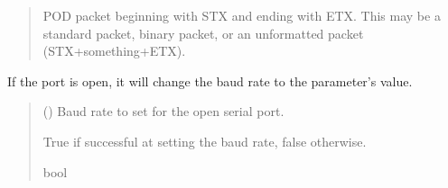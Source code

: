 \documentclass[letterpaper,10pt,english]{sphinxmanual}
\begin{document}
\begin{fulllineitems}
\begin{fulllineitems}
\begin{quote}
\begin{description}
\sphinxAtStartPar
POD packet beginning with STX and ending with ETX. This may be a                 standard packet, binary packet, or an unformatted packet (STX+something+ETX).

\sphinxAtStartPar
{\hyperref[\detokenize{Morelia.Packets:Morelia.Packets.Packet.Packet}]{}}

\end{description}\end{quote}

\end{fulllineitems}


\begin{fulllineitems}
\label{\detokenize{Morelia.Devices:Morelia.Devices.BasicPodProtocol.Pod.SetBaudrateOfDevice}}
\pysigstartsignatures
{}
\pysigstopsignatures
\sphinxAtStartPar
If the port is open, it will change the baud rate to the parameter’s value.
\begin{quote}\begin{description}
\sphinxAtStartPar
{} () \textendash{} Baud rate to set for the open serial port.

\sphinxAtStartPar
True if successful at setting the baud rate, false otherwise.

\sphinxAtStartPar
bool

\end{description}\end{quote}

\end{fulllineitems}



\end{fulllineitems}
\end{document}
